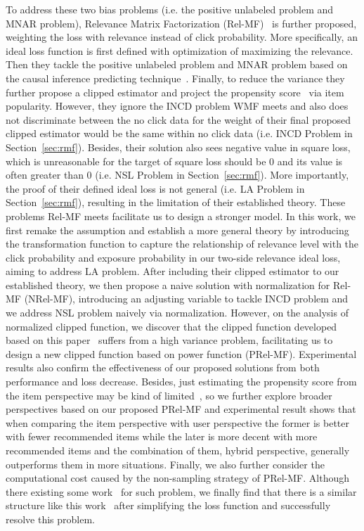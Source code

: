 \documentclass[sigconf]{acmart}
\begin{document}
To address these two bias problems (i.e. the positive unlabeled problem and MNAR problem), Relevance Matrix Factorization (Rel-MF)~\cite{saito2020unbiased} is further proposed, weighting the loss with relevance instead of click probability. More specifically, an ideal loss function is first defined with optimization of maximizing the relevance. Then they tackle the positive unlabeled problem and MNAR problem based on the causal inference predicting technique~\cite{rubin1974estimating, rosenbaum1983central, imbens2015causal}. Finally, to reduce the variance they further propose a clipped estimator and project the propensity score~\cite{rosenbaum1983central} via item popularity. However, they ignore the INCD problem WMF meets and also does not discriminate between the no click data for the weight of their final proposed clipped estimator would be the same within no click data (i.e. INCD Problem in Section~\ref{sec:rmf}). Besides, their solution also sees negative value in square loss, which is unreasonable for the target of square loss should be 0 and its value is often greater than 0 (i.e. NSL Problem in Section~\ref{sec:rmf}). More importantly, the proof of their defined ideal loss is not general (i.e. LA Problem in Section~\ref{sec:rmf}), resulting in the limitation of their established theory. These problems Rel-MF meets facilitate us to design a stronger model. In this work, we first remake the assumption and establish a more general theory by introducing the transformation function to capture the relationship of relevance level with the click probability and exposure probability in our two-side relevance ideal loss, aiming to address LA problem. After including their clipped estimator to our established theory, we then propose a naive solution with normalization for Rel-MF (NRel-MF), introducing an adjusting variable to tackle INCD problem and we address NSL problem naively via normalization. However, on the analysis of normalized clipped function, we discover that the clipped function developed based on this paper~\cite{saito2020unbiased} suffers from a high variance problem, facilitating us to design a new clipped function based on power function (PRel-MF). Experimental results also confirm the effectiveness of our proposed solutions from both performance and loss decrease. Besides, just estimating the propensity score from the item perspective may be kind of limited~\cite{saito2020unbiased}, so we further explore broader perspectives based on our proposed PRel-MF and experimental result shows that when comparing the item perspective with user perspective the former is better with fewer recommended items while the later is more decent with more recommended items and the combination of them, hybrid perspective, generally outperforms them in more situations. Finally, we also further consider the computational cost caused by the non-sampling strategy of PRel-MF. Although there existing some work~\cite{he2016fast, chen2019efficient} for such problem, we finally find that there is a similar structure like this work~\cite{chen2019efficient} after simplifying the loss function and successfully resolve this problem.
\end{document}
